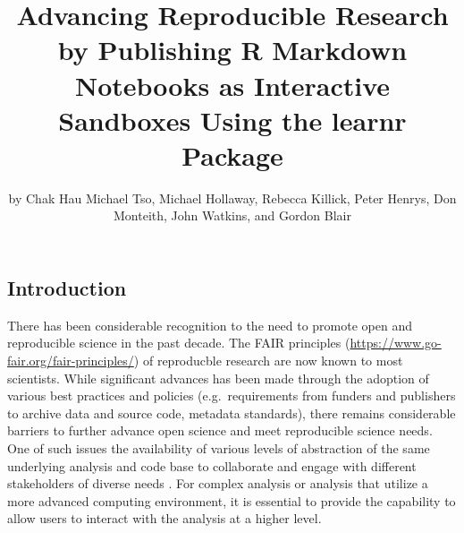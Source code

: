 \title{Advancing Reproducible Research by Publishing R Markdown
Notebooks as Interactive Sandboxes Using the learnr Package}
\author{by Chak Hau Michael Tso, Michael Hollaway, Rebecca
Killick, Peter Henrys, Don Monteith, John Watkins, and Gordon Blair}

\maketitle


\hypertarget{introduction}{%
\subsection{Introduction}\label{introduction}}

There has been considerable recognition to the need to promote open and
reproducible science in the past decade. The FAIR principles
\citep{Wilkinson2016a, Stall2019}
(\url{https://www.go-fair.org/fair-principles/}) of reproducble research
are now known to most scientists. While significant advances has been
made through the adoption of various best practices and policies
(e.g.~requirements from funders and publishers to archive data and
source code, metadata standards), there remains considerable barriers to
further advance open science and meet reproducible science needs. One of
such issues the availability of various levels of abstraction of the
same underlying analysis and code base to collaborate and engage with
different stakeholders of diverse needs \citep{Blair2019, Hollaway2020}.
For complex analysis or analysis that utilize a more advanced computing
environment, it is essential to provide the capability to allow users to
interact with the analysis at a higher level.

